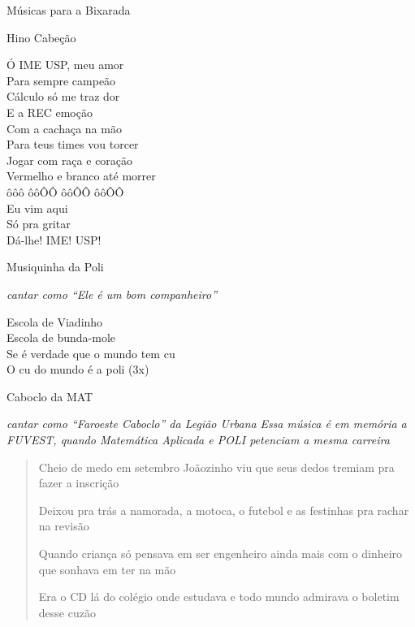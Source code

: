 \begin{secao}{Músicas para a Bixarada}


\begin{subsecao}{Hino Cabeção}


Ó IME USP, meu amor\\
Para sempre campeão\\
Cálculo só me traz dor\\
E a REC emoção\\

Com a cachaça na mão\\
Para teus times vou torcer\\
Jogar com raça e coração\\
Vermelho e branco até morrer\\

ôôô ôôÔÔ ôôÔÔ ôôÔÔ\\

Eu vim aqui\\
Só pra gritar\\
Dá-lhe! IME! USP!
\end{subsecao}

\begin{subsecao}{Musiquinha da Poli}

{\em cantar como ``Ele é um bom companheiro''}

Escola de Viadinho \\
Escola de bunda-mole \\
Se é verdade que o mundo tem cu \\
O cu do mundo é a poli  (3x)
\end{subsecao}

\begin{subsecao}{Caboclo da MAT}

{\em cantar como ``Faroeste Caboclo'' da Legião Urbana}
{\em Essa música é em memória a FUVEST, quando Matemática Aplicada e POLI 
petenciam a mesma carreira}
\begin{verse}
Cheio de medo em setembro Joãozinho viu que seus dedos tremiam pra fazer a
inscrição

Deixou pra trás a namorada, a motoca, o futebol e as festinhas pra rachar na
revisão

Quando criança só pensava em ser engenheiro ainda mais com o dinheiro que
sonhava em ter na mão

Era o CD lá do colégio onde estudava e todo mundo admirava o boletim desse
cuzão


\end{verse}
\end{subsecao}
\end{secao}
